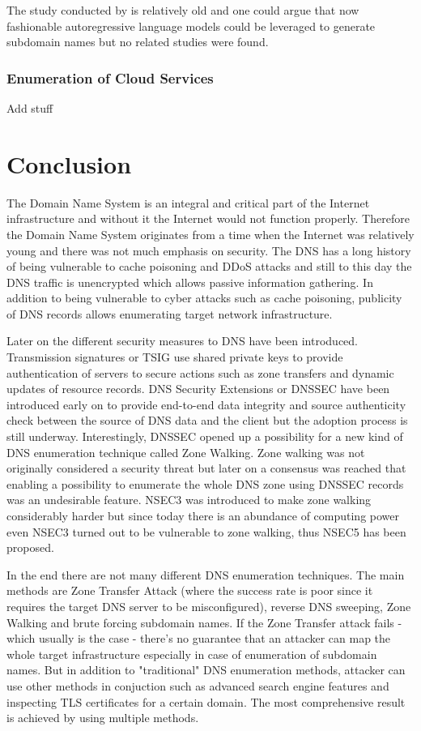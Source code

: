 The study conducted by \citet{SMART_BRUTE} is relatively old and one could argue that now fashionable autoregressive language models could be leveraged to generate subdomain names but no related studies were found.


\subsubsection{Enumeration of Cloud Services}

Add stuff


\section{Conclusion}

The Domain Name System is an integral and critical part of the Internet infrastructure and without it the Internet would not function properly. Therefore the Domain Name System originates from a time when the Internet was relatively young and there was not much emphasis on security. The DNS has a long history of being vulnerable to cache poisoning and DDoS attacks and still to this day the DNS traffic is unencrypted which allows passive information gathering. In addition to being vulnerable to cyber attacks such as cache poisoning, publicity of DNS records allows enumerating target network infrastructure.

Later on the different security measures to DNS have been introduced. Transmission signatures or TSIG use shared private keys to provide authentication of servers to secure actions such as zone transfers and dynamic updates of resource records. DNS Security Extensions or DNSSEC have been introduced early on to provide end-to-end data integrity and source authenticity check between the source of DNS data and the client but the adoption process is still underway. Interestingly, DNSSEC opened up a possibility for a new kind of DNS enumeration technique called Zone Walking. Zone walking was not originally considered a security threat but later on a consensus was reached that enabling a possibility to enumerate the whole DNS zone using DNSSEC records was an undesirable feature. NSEC3 was introduced to make zone walking considerably harder but since today there is an abundance of computing power even NSEC3 turned out to be vulnerable to zone walking, thus NSEC5 has been proposed.

In the end there are not many different DNS enumeration techniques. The main methods are Zone Transfer Attack (where the success rate is poor since it requires the target DNS server to be misconfigured), reverse DNS sweeping, Zone Walking and brute forcing subdomain names. If the Zone Transfer attack fails - which usually is the case - there's no guarantee that an attacker can map the whole target infrastructure especially in case of enumeration of subdomain names. But in addition to "traditional" DNS enumeration methods, attacker can use other methods in conjuction such as advanced search engine features and inspecting TLS certificates for a certain domain. The most comprehensive result is achieved by using multiple methods.


